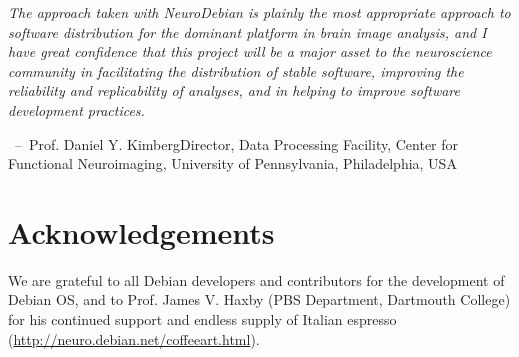 \documentclass[letterpaper,landscape]{report}
\newcommand{\epigraph}[3]{\textit{#1}\linebreak \vspace{-1.5em} \begin{flushright}\hspace{5em}\ --\ #2\linebreak\small{#3} \end{flushright}}
\begin{document}
\begin{multicols}{3}
\epigraph{The approach taken with NeuroDebian is plainly the most appropriate
approach to software distribution for the dominant platform in brain
image analysis, and I have great confidence that this project will be
a major asset to the neuroscience community in facilitating the
distribution of stable software, improving the reliability and
replicability of analyses, and in helping to improve software
development practices.}{Prof. Daniel Y. Kimberg}{Director, Data
Processing Facility, Center for Functional Neuroimaging, University of
Pennsylvania, Philadelphia, USA}

\section*{Acknowledgements}

We are grateful to all Debian developers and contributors for the
development of Debian OS, and to Prof. James V. Haxby (PBS Department,
Dartmouth College) for his continued support and endless supply of
Italian espresso (\url{http://neuro.debian.net/coffeeart.html}).

\end{multicols}
\end{document}
